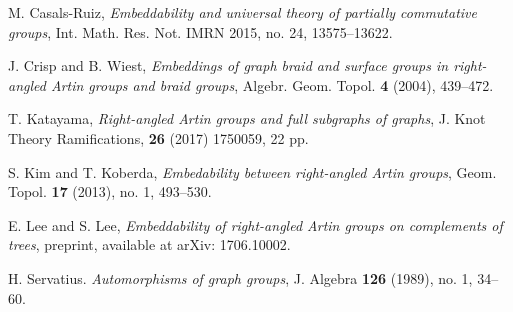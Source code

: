 \documentclass{amsart}
\theoremstyle{definition}
\theoremstyle{plain}
\numberwithin{equation}{section}
\begin{document}
\begin{thebibliography}{99}

M. Casals-Ruiz, {\it Embeddability and universal theory of partially commutative groups}, Int. Math. Res. Not. IMRN 2015, no. 24, 13575--13622.

J. Crisp and B. Wiest, {\it Embeddings of graph braid and surface groups in right-angled Artin groups and braid groups}, Algebr. Geom. Topol. {\bf 4} (2004), 439--472.

T. Katayama, {\it Right-angled Artin groups and full subgraphs of graphs}, J. Knot Theory Ramifications, {\bf 26} (2017) 1750059, 22 pp. 

S. Kim and T. Koberda, {\it Embedability between right-angled Artin groups}, Geom. Topol. {\bf 17} (2013), no. 1, 493--530.


E. Lee and S. Lee, {\it Embeddability of right-angled Artin groups on complements of trees}, preprint, available at arXiv: 1706.10002. 

H. Servatius. {\it Automorphisms of graph groups}, J. Algebra {\bf 126} (1989), no. 1, 34--60.

\end{thebibliography}
\end{document}
